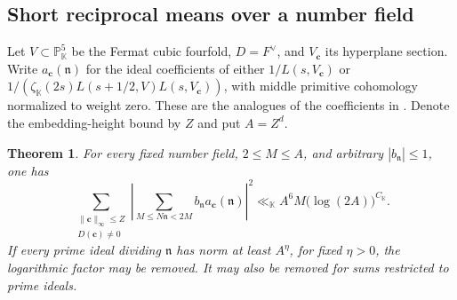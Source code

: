 \documentclass[11pt,letterpaper]{article}
\newtheorem{theorem}{Theorem}[section]
\theoremstyle{definition}
\numberwithin{equation}{section}
\begin{document}
\subsection{Short reciprocal means over a number field}\label{nf3:shortmean}
Let $V\subset\mathbb P^5_{\mathbb K}$ be the Fermat cubic fourfold,
$D=F^\vee$, and $V_{\mathbf c}$ its hyperplane section. Write
$a_{\mathbf c}(\mathfrak n)$ for the ideal coefficients of either
$1/L(s,V_{\mathbf c})$ or
$1/(\zeta_{\mathbb K}(2s)L(s+1/2,V)L(s,V_{\mathbf c}))$, with
middle primitive cohomology normalized to weight zero. These are
the analogues of the coefficients in \cite[(1.6)]{c3:wang}.
Denote the embedding-height bound by $Z$ and put $A=Z^d$.
\begin{theorem}\label{nf3:reciprocal}
For every fixed number field, $2\le M\le A$, and arbitrary
$|b_{\mathfrak n}|\le1$, one has
\[
 \sum_{\substack{\|\mathbf c\|_\infty\le Z\\D(\mathbf c)\ne0}}
 \left|\sum_{M\le N\mathfrak n<2M}
          b_{\mathfrak n}a_{\mathbf c}(\mathfrak n)\right|^2
       \ll_{\mathbb K} A^6M\big(\log(2A)\big)^{C_{\mathbb K}} .
\]
If every prime ideal dividing $\mathfrak n$ has norm at least
$A^\eta$, for fixed $\eta>0$, the logarithmic factor may be removed.
It may also be removed for sums restricted to prime ideals.
\end{theorem}
\end{document}
